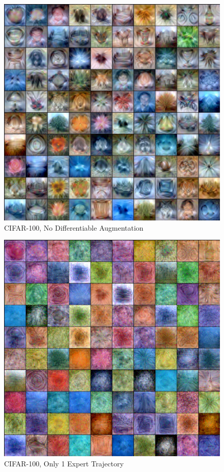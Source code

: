 \documentclass[main.tex]{subfiles}
\begin{document}
\begin{figure}
    \centering
    \includegraphics[width=\linewidth]{figures/cifar100-noaug.pdf}
    \caption{CIFAR-100, No Differentiable Augmentation}
    \label{fig:noaug}
\end{figure}
\begin{figure}
    \centering
    \includegraphics[width=\linewidth]{figures/cifar100-single.pdf}
    \caption{CIFAR-100, Only 1 Expert Trajectory}
    \label{fig:1exp}
\end{figure}
\end{document}
